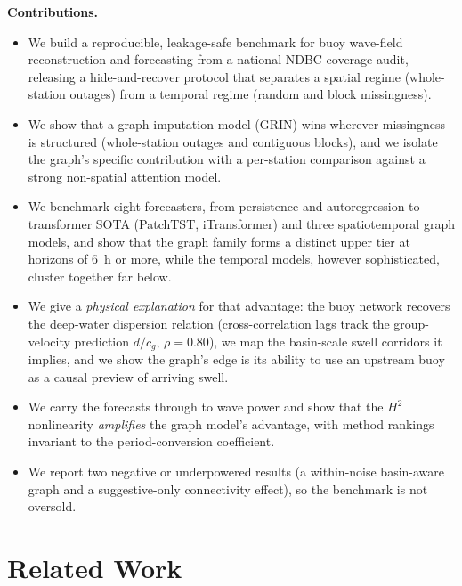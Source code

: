 \documentclass[11pt]{article}
\begin{document}
\noindent\textbf{Contributions.}
\begin{itemize}
  \item We build a reproducible, leakage-safe benchmark for buoy wave-field
  reconstruction and forecasting from a national NDBC coverage audit, releasing
  a hide-and-recover protocol that separates a spatial regime (whole-station
  outages) from a temporal regime (random and block missingness).
  \item We show that a graph imputation model (GRIN) wins wherever missingness
  is structured (whole-station outages and contiguous blocks), and we isolate the
  graph's specific contribution with a per-station comparison against a strong
  non-spatial attention model.
  \item We benchmark eight forecasters, from persistence and autoregression to
  transformer SOTA (PatchTST, iTransformer) and three spatiotemporal graph models,
  and show that the graph family forms a distinct upper tier at horizons of 6~h or
  more, while the temporal models, however sophisticated, cluster together far
  below.
  \item We give a \emph{physical explanation} for that advantage: the buoy network
  recovers the deep-water dispersion relation (cross-correlation lags track the
  group-velocity prediction $d/c_g$, $\rho=0.80$), we map the basin-scale swell
  corridors it implies, and we show the graph's edge is its ability to use an upstream
  buoy as a causal preview of arriving swell.
  \item We carry the forecasts through to wave power and show that the
  $H^{2}$ nonlinearity \emph{amplifies} the graph model's advantage, with
  method rankings invariant to the period-conversion coefficient.
  \item We report two negative or underpowered results (a within-noise
  basin-aware graph and a suggestive-only connectivity effect), so the benchmark
  is not oversold.
\end{itemize}

\section{Related Work}
\label{sec:related}
\end{document}
